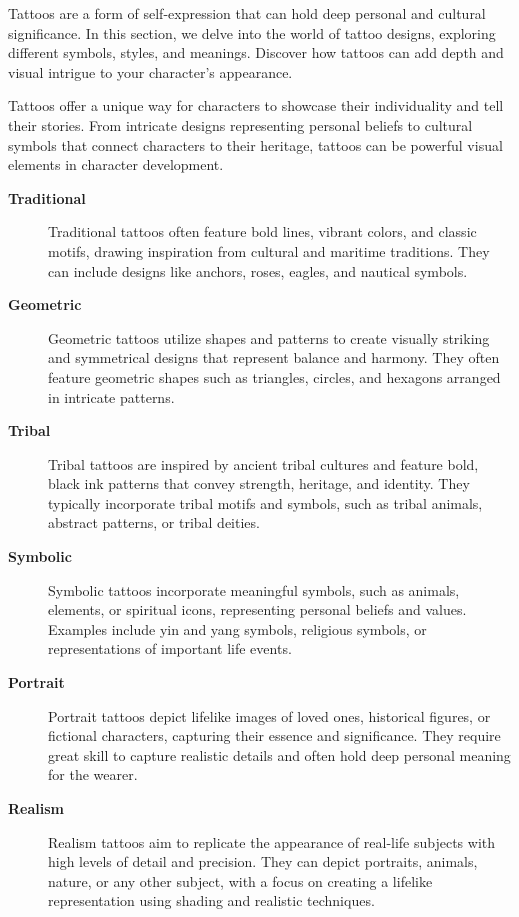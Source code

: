 Tattoos are a form of self-expression that can hold deep personal and cultural significance. In this section, we delve into the world of tattoo designs, exploring different symbols, styles, and meanings. Discover how tattoos can add depth and visual intrigue to your character's appearance.

Tattoos offer a unique way for characters to showcase their individuality and tell their stories. From intricate designs representing personal beliefs to cultural symbols that connect characters to their heritage, tattoos can be powerful visual elements in character development.

\begin{description}
    \item[\textbf{Traditional}] Traditional tattoos often feature bold lines, vibrant colors, and classic motifs, drawing inspiration from cultural and maritime traditions. They can include designs like anchors, roses, eagles, and nautical symbols.
    \item[\textbf{Geometric}] Geometric tattoos utilize shapes and patterns to create visually striking and symmetrical designs that represent balance and harmony. They often feature geometric shapes such as triangles, circles, and hexagons arranged in intricate patterns.
    \item[\textbf{Tribal}] Tribal tattoos are inspired by ancient tribal cultures and feature bold, black ink patterns that convey strength, heritage, and identity. They typically incorporate tribal motifs and symbols, such as tribal animals, abstract patterns, or tribal deities.
    \item[\textbf{Symbolic}] Symbolic tattoos incorporate meaningful symbols, such as animals, elements, or spiritual icons, representing personal beliefs and values. Examples include yin and yang symbols, religious symbols, or representations of important life events.
    \item[\textbf{Portrait}] Portrait tattoos depict lifelike images of loved ones, historical figures, or fictional characters, capturing their essence and significance. They require great skill to capture realistic details and often hold deep personal meaning for the wearer.
    \item[\textbf{Realism}] Realism tattoos aim to replicate the appearance of real-life subjects with high levels of detail and precision. They can depict portraits, animals, nature, or any other subject, with a focus on creating a lifelike representation using shading and realistic techniques.
\end{description}

